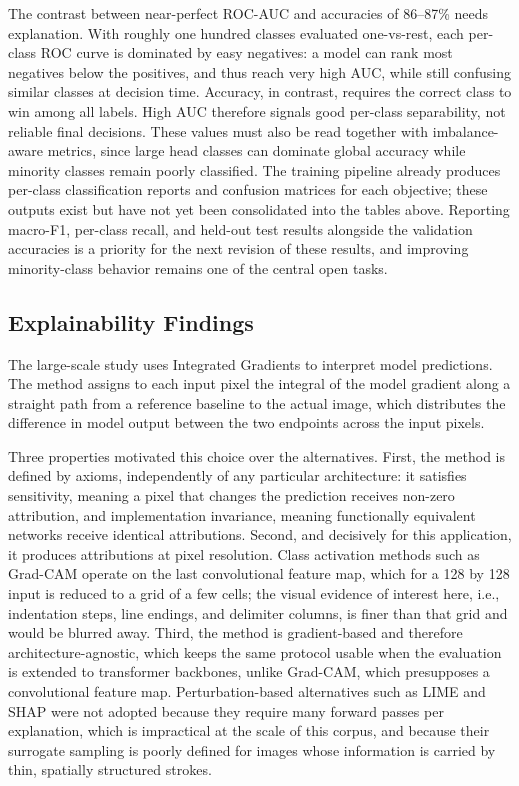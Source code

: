 The contrast between near-perfect ROC-AUC and accuracies of 86--87\% needs
explanation. With roughly one hundred classes evaluated
one-vs-rest, each per-class ROC curve is dominated by easy negatives: a model
can rank most negatives below the positives, and thus reach very high AUC,
while still confusing similar classes at decision time. Accuracy, in contrast,
requires the correct class to win among all labels. High AUC therefore signals
good per-class separability, not reliable final decisions. These values must
also be read together with imbalance-aware metrics, since large head classes
can dominate global accuracy while minority classes remain poorly classified.
The training pipeline already produces per-class classification reports and
confusion matrices for each objective; these outputs exist but have not yet
been consolidated into the tables above. Reporting macro-F1, per-class recall,
and held-out test results alongside the validation accuracies is a priority
for the next revision of these results, and improving minority-class behavior
remains one of the central open tasks.

\subsection{Explainability Findings}

The large-scale study uses Integrated Gradients \cite{integratedgradients2017}
to interpret model predictions. The method assigns to each input pixel the
integral of the model gradient along a straight path from a reference baseline
to the actual image, which distributes the difference in model output between
the two endpoints across the input pixels.

Three properties motivated this choice over the alternatives. First, the method
is defined by axioms, independently of any particular architecture: it
satisfies sensitivity,
meaning a pixel that changes the prediction receives non-zero attribution, and
implementation invariance, meaning functionally equivalent networks receive
identical attributions. Second, and decisively for this application, it produces
attributions at pixel resolution. Class activation methods such as Grad-CAM
\cite{selvaraju2017gradcam} operate on the last convolutional feature map, which
for a 128 by 128 input is reduced to a grid of a few cells; the visual evidence
of interest here, i.e., indentation steps, line endings, and delimiter columns,
is finer than that grid and would be blurred away. Third, the method is
gradient-based and therefore architecture-agnostic, which keeps the same
protocol usable when the evaluation is extended to transformer backbones, unlike
Grad-CAM, which presupposes a convolutional feature map. Perturbation-based
alternatives such as LIME and SHAP were not adopted because they require many
forward passes per explanation, which is impractical at the scale of this
corpus, and because their surrogate sampling is poorly defined for images whose
information is carried by thin, spatially structured strokes.

